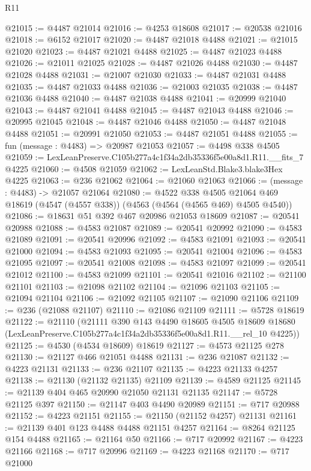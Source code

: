 \begin{lexlean}{R11}
\begin{coremodule}
@21015 := @4487 @21014
@21016 := @4253 @18608
@21017 := @20538 @21016
@21018 := @6152 @21017
@21020 := @4487 @21018 @4488
@21021 := @21015 @21020
@21023 := @4487 @21021 @4488
@21025 := @4487 @21023 @4488
@21026 := @21011 @21025
@21028 := @4487 @21026 @4488
@21030 := @4487 @21028 @4488
@21031 := @21007 @21030
@21033 := @4487 @21031 @4488
@21035 := @4487 @21033 @4488
@21036 := @21003 @21035
@21038 := @4487 @21036 @4488
@21040 := @4487 @21038 @4488
@21041 := @20999 @21040
@21043 := @4487 @21041 @4488
@21045 := @4487 @21043 @4488
@21046 := @20995 @21045
@21048 := @4487 @21046 @4488
@21050 := @4487 @21048 @4488
@21051 := @20991 @21050
@21053 := @4487 @21051 @4488
@21055 := fun (message : @4483) => @20987 @21053
@21057 := @4498 @338 @4505
@21059 := LexLeanPreserve.C105b277a4c1f34a2db35336f5e00a8d1.R11.__fits_7 @4225
@21060 := @4508 @21059
@21062 := LexLeanStd.Blake3.blake3Hex @4225
@21063 := @236 @21062
@21064 := @21060 @21063
@21066 := (message : @4483) -> @21057 @21064
@21080 := @4522
    @338
    @4505
    @21064
    @469
    @18619
    (@4547 (@4557 @338))
    (@4563 (@4564 (@4565 @469) @4505 @4540))
@21086 := @18631 @51 @392 @467 @20986 @21053 @18609
@21087 := @20541 @20988
@21088 := @4583 @21087
@21089 := @20541 @20992
@21090 := @4583 @21089
@21091 := @20541 @20996
@21092 := @4583 @21091
@21093 := @20541 @21000
@21094 := @4583 @21093
@21095 := @20541 @21004
@21096 := @4583 @21095
@21097 := @20541 @21008
@21098 := @4583 @21097
@21099 := @20541 @21012
@21100 := @4583 @21099
@21101 := @20541 @21016
@21102 := @21100 @21101
@21103 := @21098 @21102
@21104 := @21096 @21103
@21105 := @21094 @21104
@21106 := @21092 @21105
@21107 := @21090 @21106
@21109 := @236 (@21088 @21107)
@21110 := @21086 @21109
@21111 := @5728 @18619
@21122 := @21110
    (@21111
      @390
      @143
      @4490
      @18605
      @4505
      @18609
      @18680
      (LexLeanPreserve.C105b277a4c1f34a2db35336f5e00a8d1.R11.__rel_10 @4225))
@21125 := @4530 (@4534 @18609) @18619
@21127 := @4573 @21125 @278
@21130 := @21127 @466 @21051 @4488
@21131 := @236 @21087
@21132 := @4223 @21131
@21133 := @236 @21107
@21135 := @4223 @21133 @4257
@21138 := @21130 (@21132 @21135) @21109
@21139 := @4589 @21125
@21145 := @21139 @404 @465 @20990 @21050 @21131 @21135
@21147 := @5728 @21125 @397
@21150 := @21147 @403 @4490 @20989
@21151 := @717 @20988
@21152 := @4223 @21151
@21155 := @21150 (@21152 @4257) @21131
@21161 := @21139 @401 @123 @4488 @4488 @21151 @4257
@21164 := @8264 @21125 @154 @4488
@21165 := @21164 @50
@21166 := @717 @20992
@21167 := @4223 @21166
@21168 := @717 @20996
@21169 := @4223 @21168
@21170 := @717 @21000

\end{coremodule}
\end{lexlean}
